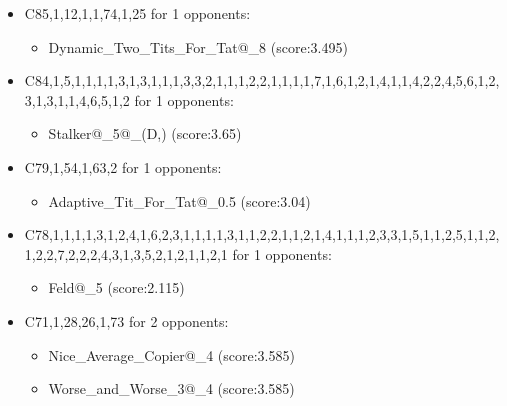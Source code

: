 \begin{appendices}
\begin{itemize}
        \item C85,1,12,1,1,74,1,25 for 1 opponents:
        \begin{multicols}{3}
            \begin{itemize}
                \item Dynamic\_Two\_Tits\_For\_Tat@\_8 (score:3.495)
            \end{itemize}
        \end{multicols}

        \item C84,1,5,1,1,1,1,3,1,3,1,1,1,3,3,2,1,1,1,2,2,1,1,1,1,7,1,6,1,2,1,4,1,1,4,2,2,4,5,6,1,2,3,1,3,1,1,4,6,5,1,2 for 1 opponents:
        \begin{multicols}{3}
            \begin{itemize}
                \item Stalker@\_5@\_(D,) (score:3.65)
            \end{itemize}
        \end{multicols}

        \item C79,1,54,1,63,2 for 1 opponents:
        \begin{multicols}{3}
            \begin{itemize}

                \item Adaptive\_Tit\_For\_Tat@\_0.5 (score:3.04)
            \end{itemize}
        \end{multicols}

        \item C78,1,1,1,1,3,1,2,4,1,6,2,3,1,1,1,1,3,1,1,2,2,1,1,2,1,4,1,1,1,2,3,3,1,5,1,1,2,5,1,1,2,1,2,2,7,2,2,2,4,3,1,3,5,2,1,2,1,1,2,1 for 1 opponents:
        \begin{multicols}{3}
            \begin{itemize}
                \item Feld@\_5 (score:2.115)
            \end{itemize}
        \end{multicols}

        \item C71,1,28,26,1,73 for 2 opponents:
        \begin{multicols}{3}
            \begin{itemize}
                \item Nice\_Average\_Copier@\_4 (score:3.585)
                \item Worse\_and\_Worse\_3@\_4 (score:3.585)
            \end{itemize}
        \end{multicols}


\end{itemize}
\end{appendices}
